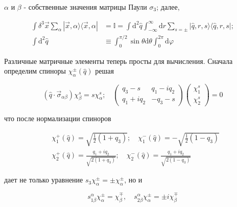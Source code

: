 \documentclass[main.tex]{subfiles}
\begin{document}
$\alpha$ и $\beta$ - собственные значения матрицы Паули $\sigma_3$; далее,

\begin{equation}\label{15.73}
	\begin{aligned}
\int \delta^{3} \vec{x} \sum_{\alpha}|\vec{x}, \alpha\rangle\langle\vec{x}, \alpha| &=\mathbb{I}=\int \mathrm{d}^{2} \hat{q} \int_{-\infty}^{\infty} \mathrm{d} r \sum_{s=\pm}|\hat{q}, r, s\rangle\langle\hat{q}, r, s|; \\
\int \mathrm{d}^{2} \hat{q} & \equiv \int_{0}^{\pi / 2} \sin \theta \mathrm{d} \theta \int_{0}^{2 \pi} \mathrm{d} \varphi
\end{aligned}
\end{equation}

Различные матричные элементы теперь просты для вычисления. Сначала определим спиноры $\chi_\alpha^\pm(\hat q)$ решая

\begin{equation}\label{15.74}
	\left(\hat{q} \cdot \vec{\sigma}_{\alpha \beta}\right) \chi_{\beta}^{s}=s \chi_{\alpha}^{s} ; \quad\left(\begin{array}{cc}
{q_{3}-s} & {q_{1}-i q_{2}} \\
{q_{1}+i q_{2}} & {-q_{3}-s}
\end{array}\right)\left(\begin{array}{c}
{\chi_{1}^{s}} \\
{\chi_{2}^{s}}
\end{array}\right)=0
\end{equation}

что после нормализации спиноров 

\begin{equation}\label{15.75}
	\begin{aligned}
&\chi_{1}^{+}(\hat{q})=\sqrt{\frac{1}{2}\left(1+q_{3}\right)} ; \quad \chi_{1}^{-}(\hat{q})=-\sqrt{\frac{1}{2}\left(1-q_{3}\right)}\\
&\chi_{2}^{+}(\hat{q})=\frac{q_{1}+i q_{2}}{\sqrt{2\left(1+q_{3}\right)}} ; \quad \chi_{2}^{-}(\hat{q})=\frac{q_{1}+i q_{2}}{\sqrt{2\left(1-q_{3}\right)}}
\end{aligned}
\end{equation}

дает не только уравнение $s_3 \chi_\alpha^\pm = \pm \chi_\alpha^\pm$, но и

\begin{equation}\label{15.76}
	s_{1 \beta}^{\alpha} \chi_{\alpha}^{\pm}=\chi_{\beta}^{\mp}, \quad s_{2 \beta}^{\alpha} \chi_{\alpha}^{\pm}=\pm i \chi_{\beta}^{\mp}
\end{equation}
                           
\end{document}
